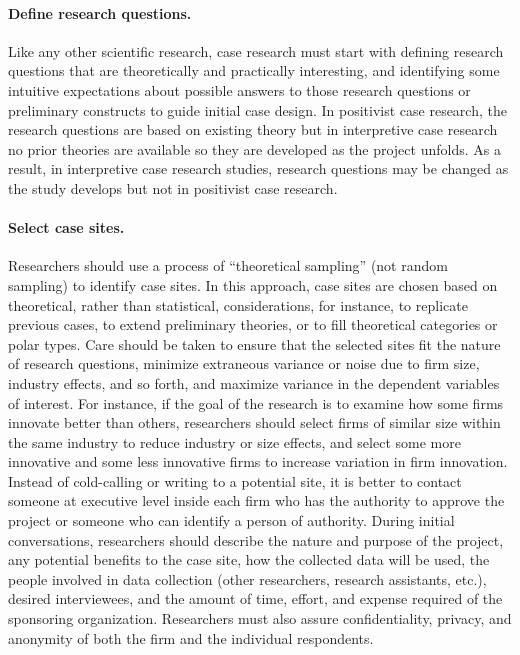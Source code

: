 \paragraph{Define research questions.} Like any other scientific research, case research must start with defining research questions that are theoretically and practically interesting, and identifying some intuitive expectations about possible answers to those research questions or preliminary constructs to guide initial case design. In positivist case research, the research questions are based on existing theory but in interpretive case research no prior theories are available so they are developed as the project unfolds. As a result, in interpretive case research studies, research questions may be changed as the study develops but not in positivist case research.

\paragraph{Select case sites.} Researchers should use a process of ``theoretical sampling'' (not random sampling) to identify case sites. In this approach, case sites are chosen based on theoretical, rather than statistical, considerations, for instance, to replicate previous cases, to extend preliminary theories, or to fill theoretical categories or polar types. Care should be taken to ensure that the selected sites fit the nature of research questions, minimize extraneous variance or noise due to firm size, industry effects, and so forth, and maximize variance in the dependent variables of interest. For instance, if the goal of the research is to examine how some firms innovate better than others, researchers should select firms of similar size within the same industry to reduce industry or size effects, and select some more innovative and some less innovative firms to increase variation in firm innovation. Instead of cold-calling or writing to a potential site, it is better to contact someone at executive level inside each firm who has the authority to approve the project or someone who can identify a person of authority. During initial conversations, researchers should describe the nature and purpose of the project, any potential benefits to the case site, how the collected data will be used, the people involved in data collection (other researchers, research assistants, etc.), desired interviewees, and the amount of time, effort, and expense required of the sponsoring organization. Researchers must also assure confidentiality, privacy, and anonymity of both the firm and the individual respondents.

